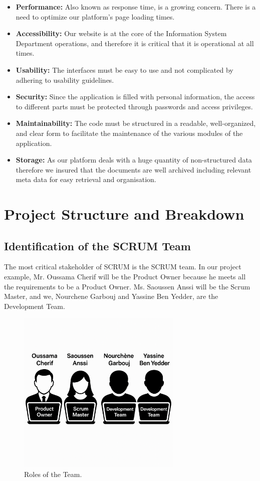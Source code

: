\begin{itemize}
    \item \textbf{Performance:} Also known as response time, is a growing concern. There is a need to optimize our platform's page loading times.

\item \textbf{Accessibility:} Our website is at the core of the Information System Department operations, and therefore it is critical that it is operational at all times.

\item \textbf{Usability:} The interfaces must be easy to use and not complicated by adhering to usability guidelines.
  
\item \textbf{Security:} Since the application is filled with personal information, the access to different parts must be protected through passwords and access privileges.
  
\item \textbf{Maintainability:} The code must be structured in a readable, well-organized, and clear form to facilitate the maintenance of the various modules of the application.
\item \textbf{Storage:} As our platform deals with a huge quantity of non-structured data therefore we insured that the documents are well archived including relevant meta data for easy retrieval and organisation.
\end{itemize}
\section{ Project Structure and Breakdown}
\subsection{Identification of the SCRUM Team}
The most critical stakeholder of SCRUM is the SCRUM team.
In our project example, Mr. Oussama Cherif will be the Product Owner because he meets all the requirements to be a Product Owner. Ms. Saoussen Anssi will be the Scrum Master, and we, Nourchene Garbouj and Yassine Ben Yedder, are the Development Team.
\begin{figure}[h]
    \centering
    \includegraphics[width=0.7\textwidth]{figures/scrumteam.png} 
    \caption{Roles of the Team.}
\end{figure} \

